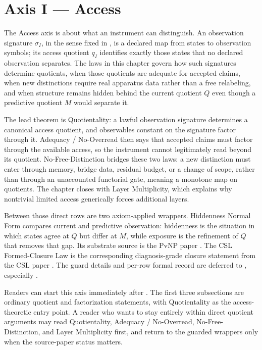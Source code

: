 \documentclass[11pt]{article}
\newcommand{\currQ}{Q}                 \newcommand{\predM}{M}                 \newcommand{\splitObs}{\Delta}         \newcommand{\quotMap}{\pi}             \newcommand{\accessQ}{q_I}             \newcommand{\obsSig}{\sigma_I}         \newcommand{\closureForm}{\mathsf{cl}} \newcommand{\BirdInt}{\mathsf{BirdInt}}
\theoremstyle{definition}
\begin{document}
 \section{Axis I — Access}\label{sec:access}

The Access axis is about what an instrument can distinguish.  An
observation signature \(\obsSig\), in the sense fixed in
, is a declared map from states to observation
symbols; its access quotient \(\accessQ\) identifies exactly those
states that no declared observation separates.  The laws in this
chapter govern how such signatures determine quotients, when those
quotients are adequate for accepted claims, when new distinctions
require real apparatus data rather than a free relabeling, and when
structure remains hidden behind the current quotient \(\currQ\) even
though a predictive quotient \(\predM\) would separate it.

The lead theorem is Quotientality: a lawful observation signature
determines a canonical access quotient, and observables constant on
the signature factor through it.  Adequacy / No-Overread then says
that accepted claims must factor through the available access, so the
instrument cannot legitimately read beyond its quotient.
No-Free-Distinction bridges these two laws: a new distinction must
enter through memory, bridge data, residual budget, or a change of
scope, rather than through an unaccounted functorial gate, meaning a
monotone map on quotients.  The chapter closes with Layer
Multiplicity, which explains why nontrivial limited access
generically forces additional layers.

Between those direct rows are two axiom-applied wrappers.  Hiddenness
Normal Form compares current and predictive observation: hiddenness
is the situation in which states agree at \(\currQ\) but differ at
\(\predM\), while exposure is the refinement of \(\currQ\) that
removes that gap.  Its substrate source is the PvNP paper
\citep{Tsiokos2026PvNP}.  The CSL Formed-Closure Law is the
corresponding diagnosis-grade closure statement from the CSL paper
\citep{Tsiokos2026CSL}.  The guard details and per-row formal record
are deferred to , especially
.

Readers can start this axis immediately after .
The first three subsections are ordinary quotient and factorization
statements, with Quotientality as the access-theoretic entry point.  A
reader who wants to stay entirely within direct quotient arguments
may read Quotientality, Adequacy / No-Overread,
No-Free-Distinction, and Layer Multiplicity first, and return to the
guarded wrappers only when the source-paper status matters.
\end{document}
